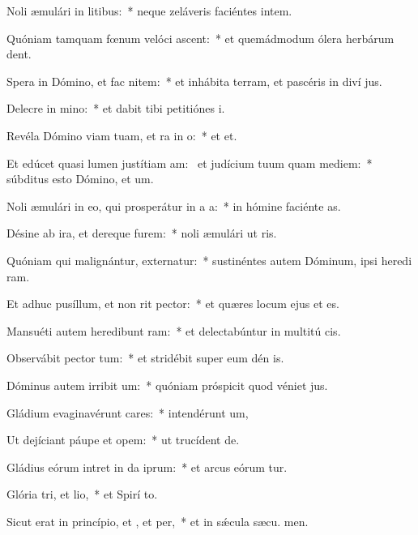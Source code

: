 \item Noli æmulári in litibus:~* neque zeláveris faciéntes intem.
\item Quóniam tamquam fœnum velóci ascent:~* et quemádmodum ólera herbárum  dent.
\item Spera in Dómino, et fac nitem:~* et inhábita terram, et pascéris in diví jus.
\item Delecre in mino:~* et dabit tibi petitiónes  i.
\item Revéla Dómino viam tuam, et ra in o:~* et  et.
\item Et edúcet quasi lumen justítiam am:~\pscross{} et judícium tuum quam mediem:~* súbditus esto Dómino, et  um.
\item Noli æmulári in eo, qui prosperátur in a a:~* in hómine faciénte as.
\item Désine ab ira, et dereque furem:~* noli æmulári ut ris.
\item Quóniam qui malignántur, externatur:~* sustinéntes autem Dóminum, ipsi heredi ram.
\item Et adhuc pusíllum, et non rit pector:~* et quæres locum ejus et  es.
\item Mansuéti autem heredibunt ram:~* et delectabúntur in multitú cis.
\item Observábit pector tum:~* et stridébit super eum dén is.
\item Dóminus autem irribit um:~* quóniam próspicit quod véniet  jus.
\item Gládium evaginavérunt cares:~* intendérunt  um,
\item Ut dejíciant páupe et opem:~* ut trucídent  de.
\item Gládius eórum intret in da iprum:~* et arcus eórum tur.
\item Glória tri, et lio,~* et Spirí to.
\item Sicut erat in princípio, et , et per,~* et in sǽcula sæcu. men.
